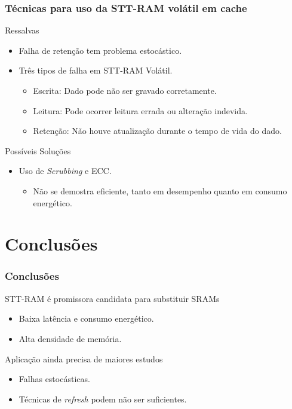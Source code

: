 \documentclass[10pt, pdf,xcolor=pdftex,dvipsnames,table]{beamer}
\begin{document}
\frame
{
\frametitle{Técnicas para uso da STT-RAM volátil em cache}
		\begin{block}{Ressalvas}
			\begin{itemize}
				\item Falha de retenção tem problema estocástico.
				\item Três tipos de falha em STT-RAM Volátil.
				\begin{itemize}
					\item Escrita: Dado pode não ser gravado corretamente.
					\item Leitura: Pode ocorrer leitura errada ou alteração indevida.
					\item Retenção: Não houve atualização durante o tempo de vida do dado.
				\end{itemize} 
			\end{itemize}	 
		\end{block}
		\begin{block}{Possíveis Soluções}
			\begin{itemize}
				\item Uso de \textit{Scrubbing} e ECC.
				\begin{itemize}
					\item Não se demostra eficiente, tanto em desempenho quanto em consumo energético.
				\end{itemize} 
			\end{itemize}	 
		\end{block}
}

\section{Conclusões}

\frame
{
\frametitle{Conclusões}
		\begin{block}{STT-RAM é promissora candidata para substituir SRAMs}
			\begin{itemize}
				\item Baixa latência e consumo energético.
				\item Alta densidade de memória.
			\end{itemize}	 
		\end{block}
		\begin{block}{Aplicação ainda precisa de maiores estudos}
			\begin{itemize}
				\item Falhas estocásticas.				
				\item Técnicas de \textit{refresh} podem não ser suficientes.
			\end{itemize}
		\end{block}
}


\titlepage
\end{document}
